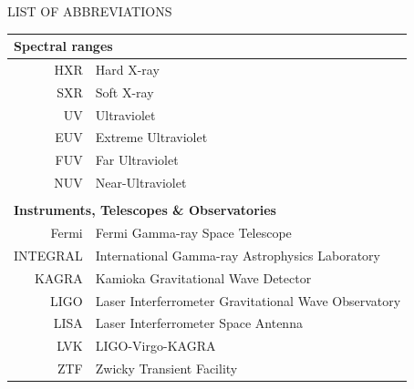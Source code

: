 
\begin{center}
LIST OF ABBREVIATIONS
\end{center}

\begin{tabular}{rl}
\multicolumn{2}{l}{\textbf{Spectral ranges}} \\
\hline
HXR & Hard X-ray \\
SXR & Soft X-ray \\
UV & Ultraviolet \\
EUV & Extreme Ultraviolet \\
FUV & Far Ultraviolet \\
NUV & Near-Ultraviolet \\
\\
\multicolumn{2}{l}{\textbf{Instruments, Telescopes \& Observatories}} \\
\hline
Fermi & Fermi Gamma-ray Space Telescope \\
INTEGRAL & International Gamma-ray Astrophysics Laboratory \\
KAGRA & Kamioka Gravitational Wave Detector \\
LIGO & Laser Interferrometer Gravitational Wave Observatory \\
LISA & Laser Interferrometer Space Antenna \\
LVK & LIGO-Virgo-KAGRA \\
ZTF & Zwicky Transient Facility \\


\end{tabular}
